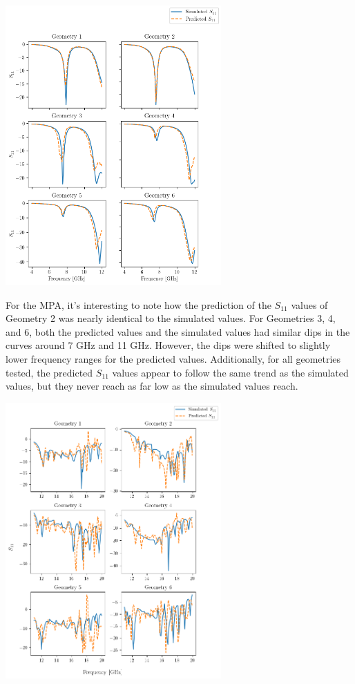 \documentclass[conference]{IEEEtran}
\newenvironment{Figure}
    {\par\medskip\noindent\minipage{\linewidth}}
    {\endminipage\par\medskip}
\begin{document}
\begin{Figure}
    \centering
    \includegraphics[width=3.25in]{unseen_geometries_freq_vs_seq}
    \label{unseen_geometries_graph_p}
\end{Figure}


For the MPA, it's interesting to note how the prediction of the $S_{11}$ values of Geometry 2 was nearly identical to the simulated values. For Geometries 3, 4, and 6, both the predicted values and the simulated values had similar dips in the curves around 7 GHz and 11 GHz. However, the dips were shifted to slightly lower frequency ranges for the predicted values. Additionally, for all geometries tested, the predicted $S_{11}$ values appear to follow the same trend as the simulated values, but they never reach as far low as the simulated values reach. 

\begin{Figure}
    \centering
    \includegraphics[width=3.25in]{unseen_geometries_freq_vs_seq_lw}
    \label{unseen_geometries_graph_lw}
\end{Figure}
\end{document}
